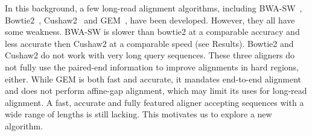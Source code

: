 \documentclass{bioinfo}
\begin{document}
In this background, a few long-read alignment algorithms, including
BWA-SW~\citep{Li:2010fk}, Bowtie2~\citep{Langmead:2012fk},
Cushaw2~\citep{Liu:2012uq} and GEM~\citep{Marco-Sola:2012kx}, have been
developed. However, they all have some weakness. BWA-SW is slower than bowtie2
at a comparable accuracy and less accurate then Cushaw2 at a comparable speed
(see Results). Bowtie2 and Cushaw2 do not work with very long query sequences.
These three aligners do not fully use the paired-end information to improve
alignments in hard regions, either.  While GEM is both fast and accurate, it
mandates end-to-end alignment and does not perform affine-gap alignment, which
may limit its uses for long-read alignment. A fast, accurate and fully featured
aligner accepting sequences with a wide range of lengths is still lacking. This
motivates us to explore a new algorithm.
\end{document}
